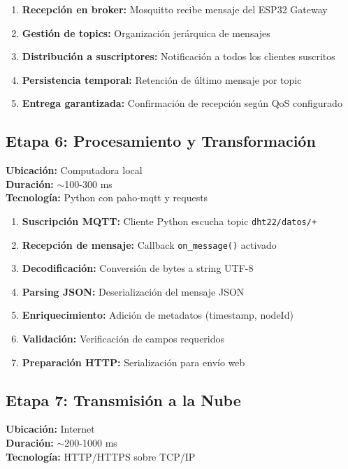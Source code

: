 \documentclass[12pt]{article}
\begin{document}
\begin{enumerate}
    \item \textbf{Recepción en broker:} Mosquitto recibe mensaje del ESP32 Gateway
    \item \textbf{Gestión de topics:} Organización jerárquica de mensajes
    \item \textbf{Distribución a suscriptores:} Notificación a todos los clientes suscritos
    \item \textbf{Persistencia temporal:} Retención de último mensaje por topic
    \item \textbf{Entrega garantizada:} Confirmación de recepción según QoS configurado
\end{enumerate}

\subsection{Etapa 6: Procesamiento y Transformación}
\textbf{Ubicación:} Computadora local\\
\textbf{Duración:} $\sim$100-300 ms\\
\textbf{Tecnología:} Python con paho-mqtt y requests

\begin{enumerate}
    \item \textbf{Suscripción MQTT:} Cliente Python escucha topic \texttt{dht22/datos/+}
    \item \textbf{Recepción de mensaje:} Callback \texttt{on\_message()} activado
    \item \textbf{Decodificación:} Conversión de bytes a string UTF-8
    \item \textbf{Parsing JSON:} Deserialización del mensaje JSON
    \item \textbf{Enriquecimiento:} Adición de metadatos (timestamp, nodeId)
    \item \textbf{Validación:} Verificación de campos requeridos
    \item \textbf{Preparación HTTP:} Serialización para envío web
\end{enumerate}

\subsection{Etapa 7: Transmisión a la Nube}
\textbf{Ubicación:} Internet\\
\textbf{Duración:} $\sim$200-1000 ms\\
\textbf{Tecnología:} HTTP/HTTPS sobre TCP/IP
\end{document}

